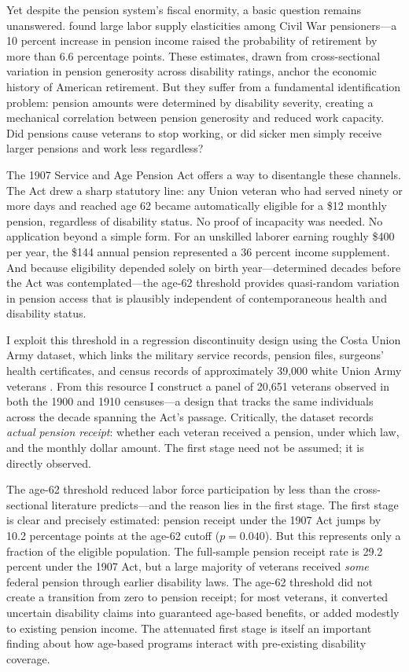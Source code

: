 \documentclass[12pt]{article}
\begin{document}
Yet despite the pension system's fiscal enormity, a basic question remains unanswered. \citet{costa1995pensions} found large labor supply elasticities among Civil War pensioners---a 10 percent increase in pension income raised the probability of retirement by more than 6.6 percentage points. These estimates, drawn from cross-sectional variation in pension generosity across disability ratings, anchor the economic history of American retirement. But they suffer from a fundamental identification problem: pension amounts were determined by disability severity, creating a mechanical correlation between pension generosity and reduced work capacity. Did pensions cause veterans to stop working, or did sicker men simply receive larger pensions and work less regardless?

The 1907 Service and Age Pension Act offers a way to disentangle these channels. The Act drew a sharp statutory line: any Union veteran who had served ninety or more days and reached age 62 became automatically eligible for a \$12 monthly pension, regardless of disability status. No proof of incapacity was needed. No application beyond a simple form. For an unskilled laborer earning roughly \$400 per year, the \$144 annual pension represented a 36 percent income supplement. And because eligibility depended solely on birth year---determined decades before the Act was contemplated---the age-62 threshold provides quasi-random variation in pension access that is plausibly independent of contemporaneous health and disability status.

I exploit this threshold in a regression discontinuity design using the Costa Union Army dataset, which links the military service records, pension files, surgeons' health certificates, and census records of approximately 39,000 white Union Army veterans \citep{fogel1993new}. From this resource I construct a panel of 20,651 veterans observed in both the 1900 and 1910 censuses---a design that tracks the same individuals across the decade spanning the Act's passage. Critically, the dataset records \textit{actual pension receipt}: whether each veteran received a pension, under which law, and the monthly dollar amount. The first stage need not be assumed; it is directly observed.

The age-62 threshold reduced labor force participation by less than the cross-sectional literature predicts---and the reason lies in the first stage. The first stage is clear and precisely estimated: pension receipt under the 1907 Act jumps by 10.2 percentage points at the age-62 cutoff ($p = 0.040$). But this represents only a fraction of the eligible population. The full-sample pension receipt rate is 29.2 percent under the 1907 Act, but a large majority of veterans received \textit{some} federal pension through earlier disability laws. The age-62 threshold did not create a transition from zero to pension receipt; for most veterans, it converted uncertain disability claims into guaranteed age-based benefits, or added modestly to existing pension income. The attenuated first stage is itself an important finding about how age-based programs interact with pre-existing disability coverage.
\end{document}
